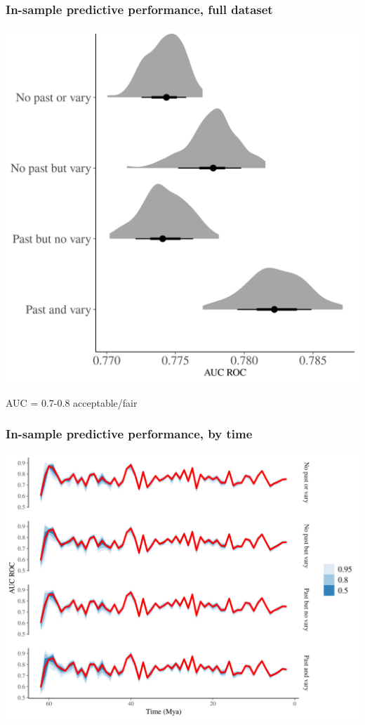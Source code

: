 \documentclass{beamer}
\begin{document}
\begin{frame}
  \frametitle{In-sample predictive performance, full dataset}

  \begin{center}
    \includegraphics[width=\textwidth,height=0.8\textheight,keepaspectratio=true]{../results/figure/auc_hist}

    \footnotesize{AUC = 0.7-0.8 acceptable/fair}
  \end{center}

\end{frame}


\begin{frame}
  \frametitle{In-sample predictive performance, by time}

  \begin{center}
    \includegraphics[width=\textwidth,height=0.8\textheight,keepaspectratio=true]{../results/figure/auc_ts}
  \end{center}

\end{frame}
\end{document}
